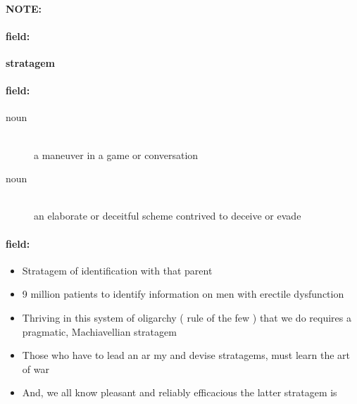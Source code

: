 \documentclass[12pt]{article}
\newenvironment{note}{\paragraph{NOTE:}}{}
\newenvironment{field}{\paragraph{field:}}{}
\begin{document}
\begin{note}
\begin{field}
\textbf{\large stratagem}
\end{field}


\begin{field}
\begin{description}
\item[noun] \hfill \\ 
a maneuver in a game or conversation

\item[noun] \hfill \\ 
an elaborate or deceitful scheme contrived to deceive or evade

\end{description}
\end{field}

\begin{field}
\begin{itemize}
\item Stratagem of identification with that parent
\item 9 million patients to identify information on men with erectile dysfunction
\item Thriving in this system of oligarchy ( rule of the few ) that we do requires a pragmatic, Machiavellian stratagem
\item Those who have to lead an ar my and devise stratagems, must learn the art of war
\item And, we all know pleasant and reliably efficacious the latter stratagem is
\end{itemize}
\end{field}
\end{note}
\end{document}
